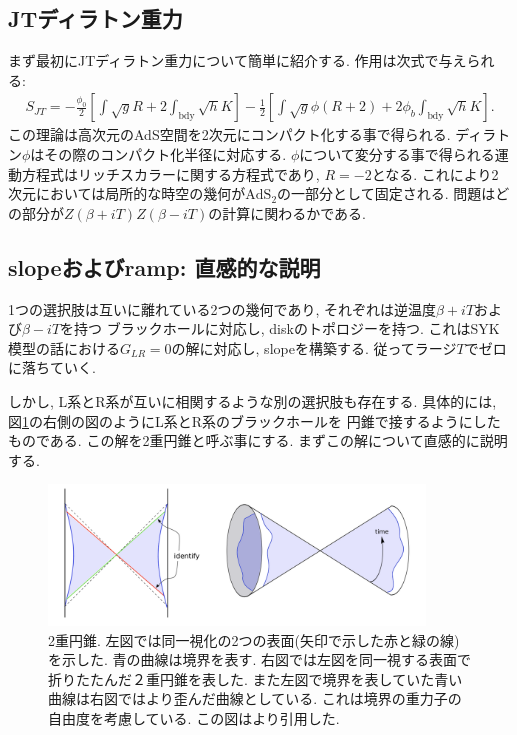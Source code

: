 \subsection{JTディラトン重力}
まず最初にJTディラトン重力について簡単に紹介する. 
作用は次式で与えられる:
\begin{align}
	S_{JT} = -\frac{\phi_0}{2}\left[\int \sqrt{g}R + 2\int_{\mathrm{bdy}}\sqrt{h}K \right]
			-\frac{1}{2}\left[
				\int \sqrt{g}\phi(R+2) + 2\phi_b\int_{\mathrm{bdy}}\sqrt{h}K
			\right].
	\label{eq:JTgravity}
\end{align}
この理論は高次元のAdS空間を2次元にコンパクト化する事で得られる. 
ディラトン$\phi$はその際のコンパクト化半径に対応する. 
$\phi$について変分する事で得られる運動方程式はリッチスカラーに関する方程式であり, $R = -2$となる. 
これにより2次元においては局所的な時空の幾何が$\mathrm{AdS}_2$の一部分として固定される. 
問題はどの部分が$Z(\beta + iT)Z(\beta - iT)$の計算に関わるかである. 

\subsection{slopeおよびramp: 直感的な説明}
1つの選択肢は互いに離れている2つの幾何であり, それぞれは逆温度$\beta + iT$および$\beta - iT$を持つ
ブラックホールに対応し, diskのトポロジーを持つ. 
これはSYK模型の話における$G_{LR} = 0$の解に対応し, slopeを構築する. 
従ってラージ$T$でゼロに落ちていく. 

しかし, L系とR系が互いに相関するような別の選択肢も存在する. 
具体的には, 図\ref{fig:double_cone}の右側の図のようにL系とR系のブラックホールを
円錐で接するようにしたものである. この解を2重円錐と呼ぶ事にする. 
まずこの解について直感的に説明する. 

\begin{figure}[ht]
	\centering
	\includegraphics[width=10cm]{figures/double_cone}
	\caption{
	2重円錐. 左図では同一視化の2つの表面(矢印で示した赤と緑の線)を示した. 
	青の曲線は境界を表す. 
	右図では左図を同一視する表面で折りたたんだ２重円錐を表した. 
	また左図で境界を表していた青い曲線は右図ではより歪んだ曲線としている. 
	これは境界の重力子の自由度を考慮している. 
	この図は\cite{stanford_chaos}より引用した. }
	\label{fig:double_cone}
\end{figure}

